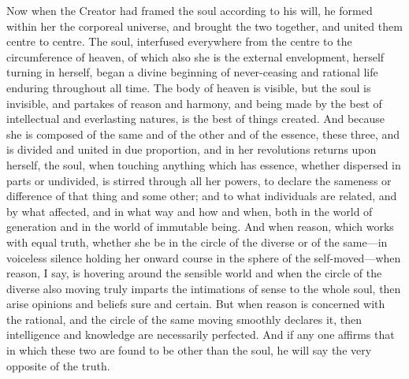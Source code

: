 Now when the Creator had framed the soul according to his will, he formed
within her the corporeal universe, and brought the two together, and
united them centre to centre. The soul, interfused everywhere from the
centre to the circumference of heaven, of which also she is the external
envelopment, herself turning in herself, began a divine beginning of
never-ceasing and rational life enduring throughout all time. The body of
heaven is visible, but the soul is invisible, and partakes of reason and
harmony, and being made by the best of intellectual and everlasting
natures, is the best of things created. And because she is composed of the
same and of the other and of the essence, these three, and is divided and
united in due proportion, and in her revolutions returns upon herself, the
soul, when touching anything which has essence, whether dispersed in parts
or undivided, is stirred through all her powers, to declare the sameness
or difference of that thing and some other; and to what individuals are
related, and by what affected, and in what way and how and when, both in
the world of generation and in the world of immutable being. And when
reason, which works with equal truth, whether she be in the circle of the
diverse or of the same—in voiceless silence holding her onward
course in the sphere of the self-moved—when reason, I say, is
hovering around the sensible world and when the circle of the diverse also
moving truly imparts the intimations of sense to the whole soul, then
arise opinions and beliefs sure and certain. But when reason is concerned
with the rational, and the circle of the same moving smoothly declares it,
then intelligence and knowledge are necessarily perfected. And if any one
affirms that in which these two are found to be other than the soul, he
will say the very opposite of the truth.

